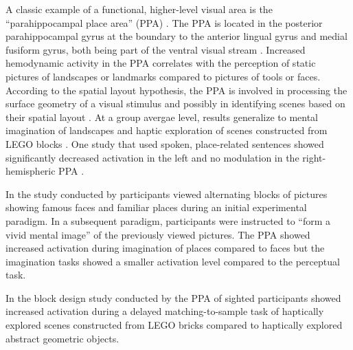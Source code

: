 \documentclass[english]{article}
\begin{document}
A classic example of a functional, higher-level visual area is the ``parahippocampal place area'' (PPA) \citep{epstein1998ppa, epstein1999parahippocampal}.
The PPA is located in the posterior parahippocampal gyrus at the boundary to the anterior lingual gyrus and medial fusiform gyrus, both being part of the ventral visual stream \citep{mishkin1982contribution, goodale1992separate}.
Increased hemodynamic activity in the PPA correlates with the perception of static pictures of landscapes or landmarks compared to pictures of tools or faces.
According to the spatial layout hypothesis, the PPA is involved in processing the surface geometry of a visual stimulus and possibly in identifying scenes based on their spatial layout \citep{epstein2010reliable}.
At a group avergae level, results generalize to mental imagination of landscapes \citep{ocraven2000mental} and haptic exploration of scenes constructed from LEGO blocks \citep{wolbers2011modality}.
One study that used spoken, place-related sentences showed significantly decreased activation in the left and no modulation in the right-hemispheric PPA \citep{aziz2008modulation}.

In the study conducted by \citep{ocraven2000mental} participants viewed alternating blocks of pictures showing famous faces and familiar places during an initial experimental paradigm.
In a subsequent paradigm, participants were instructed to ``form a vivid mental image'' of the previously viewed pictures.
The PPA showed increased activation during imagination of places compared to faces but the imagination tasks showed a smaller activation level compared to the perceptual task.

In the block design study conducted by \citep{wolbers2011modality} the PPA of sighted participants showed increased activation during a delayed matching-to-sample task of haptically explored scenes constructed from LEGO bricks compared to haptically explored abstract geometric objects.
\end{document}
